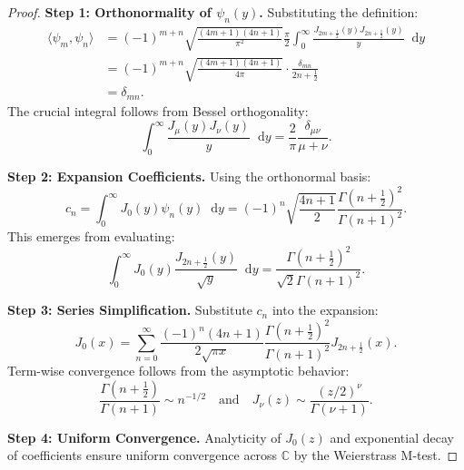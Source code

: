 \documentclass{article}
\theoremstyle{plain}
\newcommand{\d}{\mathop{}\!\mathrm{d}} %
\begin{document}
\begin{proof}
\textbf{Step 1: Orthonormality of $\psi_n(y)$.} Substituting the definition:
\begin{align*}
\langle \psi_m, \psi_n \rangle &= (-1)^{m+n} \sqrt{\frac{(4m+1)(4n+1)}{\pi^2}} \frac{\pi}{2} \int_0^\infty \frac{J_{2m+\frac{1}{2}}(y)J_{2n+\frac{1}{2}}(y)}{y} \d y \\
&= (-1)^{m+n} \sqrt{\frac{(4m+1)(4n+1)}{4\pi}} \cdot \frac{\delta_{mn}}{2n+\frac{1}{2}} \\
&= \delta_{mn}.
\end{align*}
The crucial integral follows from Bessel orthogonality: 
\[
\int_0^\infty \frac{J_\mu(y)J_\nu(y)}{y} \d y = \frac{2}{\pi} \frac{\delta_{\mu\nu}}{\mu + \nu}.
\]

\textbf{Step 2: Expansion Coefficients.} Using the orthonormal basis:
\[
c_n = \int_0^\infty J_0(y)\psi_n(y) \d y = (-1)^n \sqrt{\frac{4n+1}{2}} \frac{\Gamma(n + \frac{1}{2})^2}{\Gamma(n+1)^2}.
\]
This emerges from evaluating:
\[
\int_0^\infty J_0(y)\frac{J_{2n+\frac{1}{2}}(y)}{\sqrt{y}} \d y = \frac{\Gamma(n + \frac{1}{2})^2}{\sqrt{2}\Gamma(n+1)^2}.
\]

\textbf{Step 3: Series Simplification.} Substitute $c_n$ into the expansion:
\[
J_0(x) = \sum_{n=0}^\infty \frac{(-1)^n(4n+1)}{2\sqrt{\pi x}} \frac{\Gamma(n + \frac{1}{2})^2}{\Gamma(n+1)^2} J_{2n+\frac{1}{2}}(x).
\]
Term-wise convergence follows from the asymptotic behavior:
\[
\frac{\Gamma(n + \frac{1}{2})}{\Gamma(n+1)} \sim n^{-1/2} \quad \text{and} \quad J_\nu(z) \sim \frac{(z/2)^\nu}{\Gamma(\nu+1)}.
\]

\textbf{Step 4: Uniform Convergence.} Analyticity of $J_0(z)$ and exponential decay of coefficients ensure uniform convergence across $\mathbb{C}$ by the Weierstrass M-test.
\end{proof}
\end{document}
